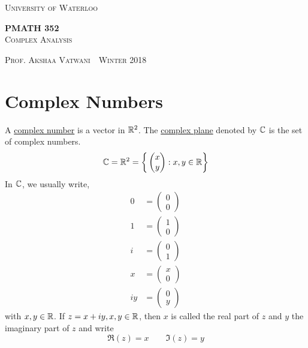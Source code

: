 \documentclass[11pt]{article}
\newcommand{\thiscoursecode}{PMATH 352}
\newcommand{\thiscoursename}{Complex Analysis}
\newcommand{\thisprof}{Prof. Akshaa Vatwani}
\newcommand{\thisterm}{Winter 2018}
\begin{document}
\begin{titlepage}
	\begin{centering}
		{\scshape\LARGE University of Waterloo \par}
		\globe
		{\huge\bf \thiscoursecode}\\
		{\scshape\Large \thiscoursename}\\
		\vspace{.3cm}
		{\scshape \thisprof~\textbullet~\thisterm \par}
	\end{centering}
	\sectionline
	\tableofcontents
	\sectionline
	\thispagestyle{empty}
\end{titlepage}

\section{Complex Numbers}
\begin{definition}
	A \underline{complex number} is a vector in $\mathbb{R}^2$. The \underline{complex
	plane} denoted by $\mathbb{C}$ is the set of complex numbers.
	\begin{equation*}
		\mathbb{C} = \mathbb{R}^2 = \bigg\{\begin{pmatrix}x\\y\end{pmatrix}: x, y \in \mathbb{R} \bigg\}
	\end{equation*}
	In $\mathbb{C}$, we usually write,
	\begin{align*}
		0 &= \begin{pmatrix}0\\0\end{pmatrix}\\
		1 &= \begin{pmatrix}1\\0\end{pmatrix}\\
		i &= \begin{pmatrix}0\\1\end{pmatrix}\\
		x &= \begin{pmatrix}x\\0\end{pmatrix}\\
		iy &= \begin{pmatrix}0\\y\end{pmatrix}
	\end{align*}
	with $x, y \in \mathbb{R}$. If $z = x+iy, x, y \in \mathbb{R}$, then $x$ is called the
	real part of $z$ and $y$ the imaginary part of $z$ and write
	\begin{equation*}
		\Re(z) = x \qquad \Im(z) = y
	\end{equation*}
\end{definition}
\end{document}
